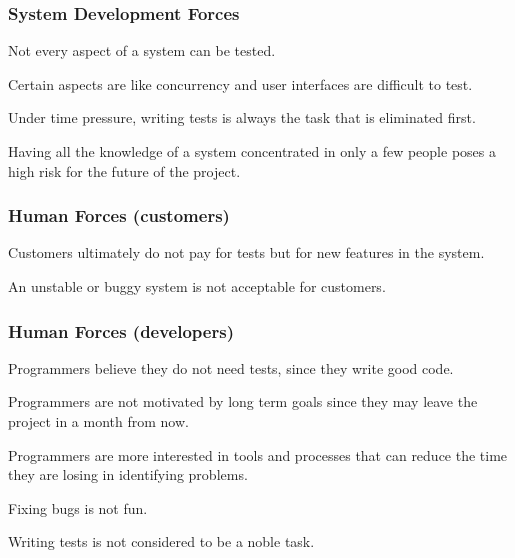 \documentclass[a4paper,10pt,twoside]{book}
\begin{document}
\subsubsection*{System Development Forces}

\begin{bulletlist}
\item Not every aspect of a system can be tested.

\item Certain aspects are like concurrency and user interfaces are difficult to test.

\item Under time pressure, writing tests is always the task that is eliminated first.

\item Having all the knowledge of a system concentrated in only a few people poses a high risk for the future of the project.
\end{bulletlist}

\subsubsection*{Human Forces (customers)}

\begin{bulletlist}
\item Customers ultimately do not pay for tests but for new features in the system.

\item An unstable or buggy system is not acceptable for customers.
\end{bulletlist}

\subsubsection*{Human Forces (developers)}

\begin{bulletlist}
\item Programmers believe they do not need tests, since they write good code. 

\item Programmers are not motivated by long term goals since they may leave the project in a month from now. 

\item Programmers are more interested in tools and processes that can reduce the time they are losing in identifying problems.

\item Fixing bugs is not fun.

\item Writing tests is not considered to be a noble task.
\end{bulletlist}
\end{document}

